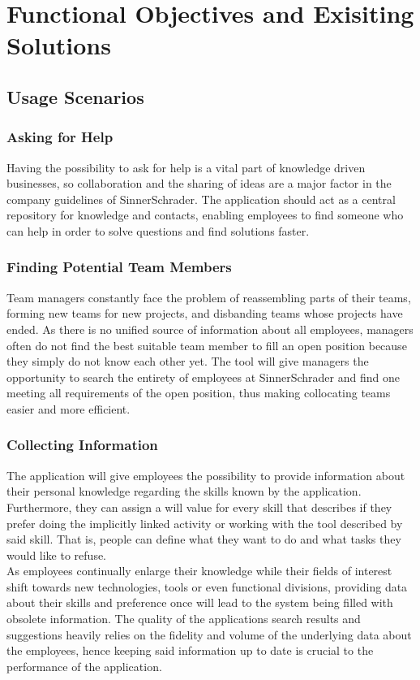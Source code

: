 \chapter{Functional Objectives and Exisiting Solutions}

\section{Usage Scenarios}
\subsection{Asking for Help}
Having the possibility to ask for help is a vital part of knowledge driven
businesses, so collaboration and the sharing of ideas are a major factor in the company guidelines
of SinnerSchrader. The application should act as a central repository for knowledge and contacts,
enabling employees to find someone who can help in order to solve questions and find solutions faster.

\subsection{Finding Potential Team Members}
Team managers constantly face the problem of reassembling parts of their teams, forming new teams for new projects, and
disbanding teams whose projects have ended. As there is no unified source of information about all employees, managers often
do not find the best suitable team member to fill an open position because they simply do not know each other yet.
The tool will give managers the opportunity to search the entirety of employees at SinnerSchrader and find one
meeting all requirements of the open position, thus making collocating teams easier and more efficient.

\subsection{Collecting Information}
The application will give employees the possibility to provide information about their personal knowledge regarding the
skills known by the application. Furthermore, they can assign a will value for every skill that describes if they prefer
doing the implicitly linked activity or working with the tool described by said skill. That is, people can define what they want to do and what tasks they would like to refuse.\\
As employees continually enlarge their knowledge while their fields of interest shift towards new technologies, tools or even
functional divisions, providing data about their skills and preference once will lead to the system being filled with obsolete
information. The quality of the applications search results and suggestions heavily relies on the fidelity and volume of the underlying data about the employees, hence keeping said information up to date is crucial to the performance of the application.

